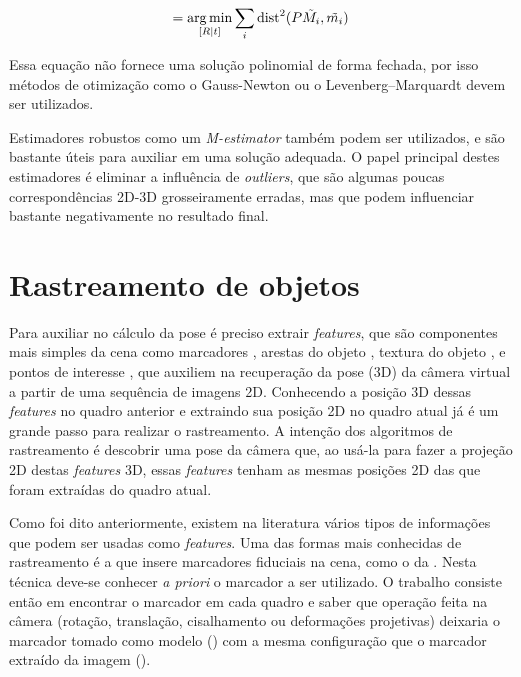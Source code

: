 \begin{equation}
[R | t] = \argmin_{[R | t]} \sum_i \text{dist}^2(P\tilde{M_i}, \tilde{m_i})
\label{calculo_pose}
\end{equation}

Essa equação não fornece uma solução polinomial de forma fechada, por isso métodos de otimização como o Gauss-Newton \cite{gauss_newton} ou o Levenberg–Marquardt \cite{levenberg} devem ser utilizados.

Estimadores robustos como um \emph{M-estimator} \cite{lepetit} também podem ser utilizados, e são bastante úteis para auxiliar em uma solução adequada. O papel principal destes estimadores é eliminar a influência de \emph{outliers}, que são algumas poucas correspondências 2D-3D grosseiramente erradas, mas que podem influenciar bastante negativamente no resultado final.

\section{Rastreamento de objetos}

Para auxiliar no cálculo da pose é preciso extrair \emph{features}, que são componentes mais simples da cena como marcadores \cite{roberto2012mestrado}, arestas do objeto \cite{teichrieb2007survey}, textura do objeto \cite{mestradochico}, e pontos de interesse \cite{mestradochico}, que auxiliem na recuperação da pose (3D) da câmera virtual a partir de uma sequência de imagens 2D. Conhecendo a posição 3D dessas \emph{features} no quadro anterior e extraindo sua posição 2D no quadro atual já é um grande passo para realizar o rastreamento. A intenção dos algoritmos de rastreamento é descobrir uma pose da câmera que, ao usá-la para fazer a projeção 2D destas \emph{features} 3D, essas \emph{features} tenham as mesmas posições 2D das que foram extraídas do quadro atual.

Como foi dito anteriormente, existem na literatura vários tipos de informações que podem ser usadas como \emph{features}. Uma das formas mais conhecidas de rastreamento é a que insere marcadores fiduciais na cena, como o da . Nesta técnica deve-se conhecer \emph{a priori} o marcador a ser utilizado. O trabalho consiste então em encontrar o marcador em cada quadro e saber que operação feita na câmera (rotação, translação, cisalhamento ou deformações projetivas) deixaria o marcador tomado como modelo () com a mesma configuração que o marcador extraído da imagem ().

